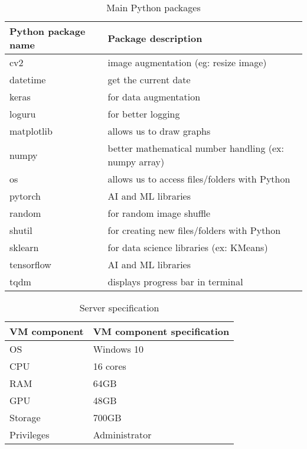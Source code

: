\begin{table}[ht]
  \centering
    \begin{tabular}{ |m{12em}|m{20em}| } 
     \hline
     Python package name & Package description \\ 
     \hline
        cv2 & image augmentation (eg: resize image) \\
     \hline
        datetime & get the current date \\
     \hline
        keras & for data augmentation \\
     \hline
        loguru & for better logging \\
     \hline
        matplotlib & allows us to draw graphs \\
     \hline
        numpy & better mathematical number handling (ex: numpy array) \\
     \hline
        os & allows us to access files/folders with Python \\
     \hline
        pytorch & AI and ML libraries \\
     \hline
        random & for random image shuffle \\
     \hline
        shutil & for creating new files/folders with Python \\
     \hline
        sklearn & for data science libraries (ex: KMeans) \\
     \hline
        tensorflow & AI and ML libraries \\
     \hline
        tqdm & displays progress bar in terminal \\
     \hline
    \end{tabular}
\caption{Main Python packages}
\end{table}

\begin{table}[ht]
  \centering
    \begin{tabular}{ |m{12em}|m{20em}| } 
     \hline
     VM component &  VM component specification \\ 
     \hline
        OS & Windows 10 \\
     \hline
        CPU & 16 cores \\
     \hline
        RAM & 64GB \\
     \hline
        GPU & 48GB \\
     \hline
        Storage & 700GB \\
     \hline
        Privileges & Administrator \\
     \hline
    \end{tabular}
\caption{Server specification}
\end{table}